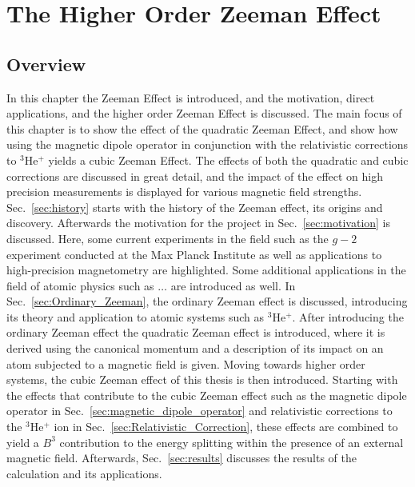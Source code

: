 

\chapter{The Higher Order Zeeman Effect}\label{sec:Zeeman-Effect}
    \section{Overview}
        In this chapter the Zeeman Effect is introduced, and the motivation, direct applications, and the higher order Zeeman Effect is discussed. The main focus of this chapter is to show the effect of the quadratic Zeeman Effect, and show how using the magnetic dipole operator in conjunction with the relativistic corrections to $^3$He$^+$ yields a cubic Zeeman Effect. The effects of both the quadratic and cubic corrections are discussed in great detail, and the impact of the effect on high precision measurements is displayed for various magnetic field strengths.\\

       Sec.~\ref{sec:history} starts with the history of the Zeeman effect, its origins and discovery. Afterwards the motivation for the project in Sec.~\ref{sec:motivation} is discussed. Here, some current experiments in the field such as the $g-2$ experiment conducted at the Max Planck Institute as well as applications to high-precision magnetometry are highlighted. Some additional applications in the field of atomic physics such as $\dots$ are introduced as well. In Sec.~\ref{sec:Ordinary_Zeeman}, the ordinary Zeeman effect is discussed, introducing its theory and application to atomic systems such as $^3$He$^+$. After introducing the ordinary Zeeman effect the quadratic Zeeman effect is introduced, where it is derived using the canonical momentum and a description of its impact on an atom subjected to a magnetic field is given. Moving towards higher order systems, the cubic Zeeman effect of this thesis is then introduced. Starting with the effects that contribute to the cubic Zeeman effect such as the magnetic dipole operator in Sec.~\ref{sec:magnetic_dipole_operator} and relativistic corrections to the $^3$He$^+$ ion in Sec.~\ref{sec:Relativistic_Correction}, these effects are combined to yield a $B^3$ contribution to the energy splitting within the presence of an external magnetic field. Afterwards, Sec.~\ref{sec:results} discusses the results of the calculation and its applications.

